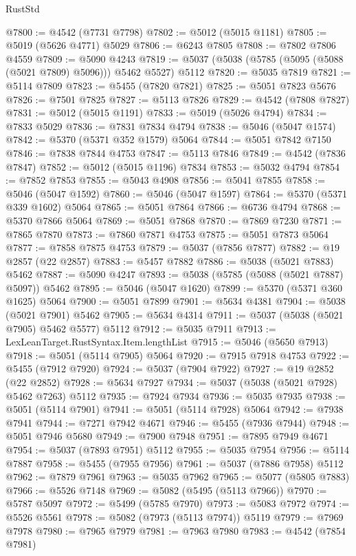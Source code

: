 \begin{lexlean}{RustStd}
\begin{coremodule}
@7800 := @4542 (@7731 @7798)
@7802 := @5012 (@5015 @1181)
@7805 := @5019 (@5626 @4771) @5029
@7806 := @6243 @7805
@7808 := @7802 @7806 @4559
@7809 := @5090 @4243
@7819 := @5037 (@5038 (@5785 (@5095 (@5088 (@5021 @7809) @5096))) @5462 @5527) @5112
@7820 := @5035 @7819
@7821 := @5114 @7809
@7823 := @5455 (@7820 @7821)
@7825 := @5051 @7823 @5676
@7826 := @7501 @7825
@7827 := @5113 @7826
@7829 := @4542 (@7808 @7827)
@7831 := @5012 (@5015 @1191)
@7833 := @5019 (@5026 @4794)
@7834 := @7833 @5029
@7836 := @7831 @7834 @4794
@7838 := @5046 (@5047 @1574)
@7842 := @5370 (@5371 @352 @1579) @5064
@7844 := @5051 @7842 @7150
@7846 := @7838 @7844 @4753
@7847 := @5113 @7846
@7849 := @4542 (@7836 @7847)
@7852 := @5012 (@5015 @1196) @7834
@7853 := @5032 @4794
@7854 := @7852 @7853
@7855 := @5043 @4908
@7856 := @5041 @7855
@7858 := @5046 (@5047 @1592)
@7860 := @5046 (@5047 @1597)
@7864 := @5370 (@5371 @339 @1602) @5064
@7865 := @5051 @7864
@7866 := @6736 @4794
@7868 := @5370 @7866 @5064
@7869 := @5051 @7868
@7870 := @7869 @7230
@7871 := @7865 @7870
@7873 := @7860 @7871 @4753
@7875 := @5051 @7873 @5064
@7877 := @7858 @7875 @4753
@7879 := @5037 (@7856 @7877)
@7882 := @19 @2857 (@22 @2857)
@7883 := @5457 @7882
@7886 := @5038 (@5021 @7883) @5462
@7887 := @5090 @4247
@7893 := @5038 (@5785 (@5088 (@5021 @7887) @5097)) @5462
@7895 := @5046 (@5047 @1620)
@7899 := @5370 (@5371 @360 @1625) @5064
@7900 := @5051 @7899
@7901 := @5634 @4381
@7904 := @5038 (@5021 @7901) @5462
@7905 := @5634 @4314
@7911 := @5037 (@5038 (@5021 @7905) @5462 @5577) @5112
@7912 := @5035 @7911
@7913 := LexLeanTarget.RustSyntax.Item.lengthList
@7915 := @5046 (@5650 @7913)
@7918 := @5051 (@5114 @7905) @5064
@7920 := @7915 @7918 @4753
@7922 := @5455 (@7912 @7920)
@7924 := @5037 (@7904 @7922)
@7927 := @19 @2852 (@22 @2852)
@7928 := @5634 @7927
@7934 := @5037 (@5038 (@5021 @7928) @5462 @7263) @5112
@7935 := @7924 @7934
@7936 := @5035 @7935
@7938 := @5051 (@5114 @7901)
@7941 := @5051 (@5114 @7928) @5064
@7942 := @7938 @7941
@7944 := @7271 @7942 @4671
@7946 := @5455 (@7936 @7944)
@7948 := @5051 @7946 @5680
@7949 := @7900 @7948
@7951 := @7895 @7949 @4671
@7954 := @5037 (@7893 @7951) @5112
@7955 := @5035 @7954
@7956 := @5114 @7887
@7958 := @5455 (@7955 @7956)
@7961 := @5037 (@7886 @7958) @5112
@7962 := @7879 @7961
@7963 := @5035 @7962
@7965 := @5077 (@5805 @7883)
@7966 := @5526 @7148
@7969 := @5082 (@5495 (@5113 @7966))
@7970 := @5787 @5097
@7972 := @5499 (@5785 @7970)
@7973 := @5083 @7972
@7974 := @5526 @5561
@7978 := @5082 (@7973 (@5113 @7974)) @5119
@7979 := @7969 @7978
@7980 := @7965 @7979
@7981 := @7963 @7980
@7983 := @4542 (@7854 @7981)

\end{coremodule}
\end{lexlean}
